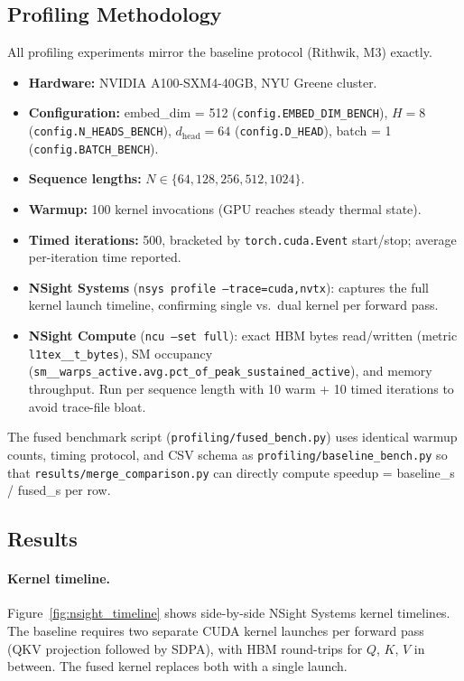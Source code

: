 \subsection{Profiling Methodology}
\label{sec:profiling_method}

All profiling experiments mirror the baseline protocol (Rithwik, M3) exactly.

\begin{itemize}
  \item \textbf{Hardware:} NVIDIA A100-SXM4-40GB, NYU Greene cluster.
  \item \textbf{Configuration:} embed\_dim = 512 (\texttt{config.EMBED\_DIM\_BENCH}),
        $H = 8$ (\texttt{config.N\_HEADS\_BENCH}),
        $d_{\text{head}} = 64$ (\texttt{config.D\_HEAD}),
        batch = 1 (\texttt{config.BATCH\_BENCH}).
  \item \textbf{Sequence lengths:} $N \in \{64, 128, 256, 512, 1024\}$.
  \item \textbf{Warmup:} 100 kernel invocations (GPU reaches steady thermal state).
  \item \textbf{Timed iterations:} 500, bracketed by \texttt{torch.cuda.Event}
        start/stop; average per-iteration time reported.
  \item \textbf{NSight Systems} (\texttt{nsys profile --trace=cuda,nvtx}):
        captures the full kernel launch timeline, confirming single vs.\ dual
        kernel per forward pass.
  \item \textbf{NSight Compute} (\texttt{ncu --set full}):
        exact HBM bytes read/written (metric \texttt{l1tex\_\_t\_bytes}),
        SM occupancy (\texttt{sm\_\_warps\_active.avg.pct\_of\_peak\_sustained\_active}),
        and memory throughput. Run per sequence length with 10 warm + 10 timed
        iterations to avoid trace-file bloat.
\end{itemize}

The fused benchmark script (\texttt{profiling/fused\_bench.py}) uses identical
warmup counts, timing protocol, and CSV schema as \texttt{profiling/baseline\_bench.py}
so that \texttt{results/merge\_comparison.py} can directly compute
speedup = baseline\_\textmu s / fused\_\textmu s per row.

\subsection{Results}
\label{sec:profiling_results}

\paragraph{Kernel timeline.}
Figure~\ref{fig:nsight_timeline} shows side-by-side NSight Systems kernel timelines.
The baseline requires two separate CUDA kernel launches per forward pass
(QKV projection followed by SDPA), with HBM round-trips for $Q$, $K$, $V$
in between.
The fused kernel replaces both with a single launch.

